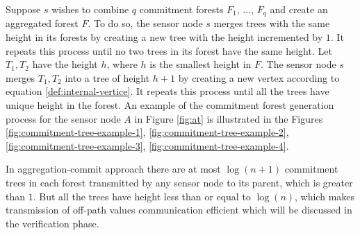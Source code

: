 		Suppose $s$ wishes to combine $q$ commitment forests $F_{1}$, $\dotsc$, $F_{q}$ and create an aggregated forest $F$.
		To do so, the sensor node $s$ merges trees with the same height in its forests by creating a new tree with the height incremented by $1$. 
		It repeats this process until no two trees in its forest have the same height. 
		Let $T_{1}, T_{2}$ have the height $h$, where $h$ is the smallest height in $F$.
		The sensor node $s$ merges $T_{1}, T_{2}$ into a tree of height $h + 1$ by creating a new vertex according to equation \ref{def:internal-vertice}.
		It repeats this process until all the trees have unique height in the forest.
		An example of the commitment forest generation process for the sensor node $A$ in Figure \ref{fig:at} is illustrated in the Figures \ref{fig:commitment-tree-example-1}, \ref{fig:commitment-tree-example-2}, \ref{fig:commitment-tree-example-3}, \ref{fig:commitment-tree-example-4}.

		In aggregation-commit approach there are at most $\log(n+1)$ commitment trees in each forest transmitted by any sensor node to its parent, which is greater than $1$.
		But all the trees have height less than or equal to $\log(n)$, which makes transmission of off-path values communication efficient which will be discussed in the verification phase.

